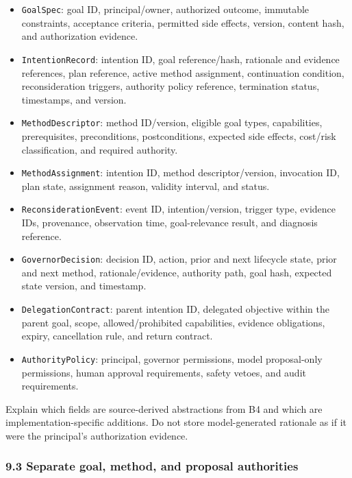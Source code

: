 \begin{itemize}
\tightlist
\item
  \texttt{GoalSpec}: goal ID, principal/owner, authorized outcome, immutable constraints, acceptance criteria, permitted side effects, version, content hash, and authorization evidence.
\item
  \texttt{IntentionRecord}: intention ID, goal reference/hash, rationale and evidence references, plan reference, active method assignment, continuation condition, reconsideration triggers, authority policy reference, termination status, timestamps, and version.
\item
  \texttt{MethodDescriptor}: method ID/version, eligible goal types, capabilities, prerequisites, preconditions, postconditions, expected side effects, cost/risk classification, and required authority.
\item
  \texttt{MethodAssignment}: intention ID, method descriptor/version, invocation ID, plan state, assignment reason, validity interval, and status.
\item
  \texttt{ReconsiderationEvent}: event ID, intention/version, trigger type, evidence IDs, provenance, observation time, goal-relevance result, and diagnosis reference.
\item
  \texttt{GovernorDecision}: decision ID, action, prior and next lifecycle state, prior and next method, rationale/evidence, authority path, goal hash, expected state version, and timestamp.
\item
  \texttt{DelegationContract}: parent intention ID, delegated objective within the parent goal, scope, allowed/prohibited capabilities, evidence obligations, expiry, cancellation rule, and return contract.
\item
  \texttt{AuthorityPolicy}: principal, governor permissions, model proposal-only permissions, human approval requirements, safety vetoes, and audit requirements.
\end{itemize}

Explain which fields are source-derived abstractions from B4 and which are implementation-specific additions. Do not store model-generated rationale as if it were the principal's authorization evidence.

\subsubsection{9.3 Separate goal, method, and proposal authorities}\label{separate-goal-method-and-proposal-authorities}

